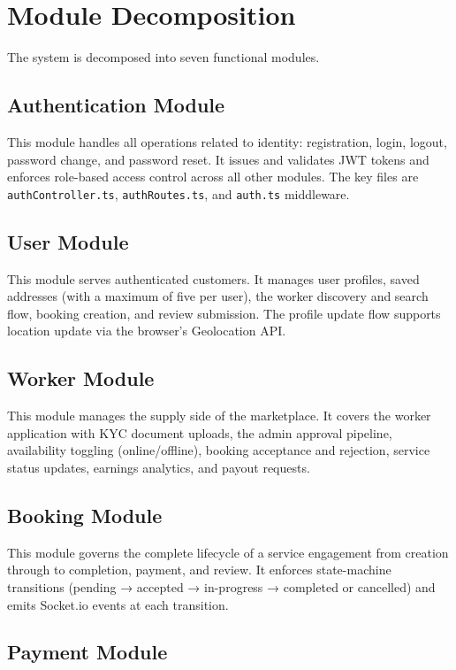 \documentclass[12pt,a4paper]{report}
\begin{document}
\section{Module Decomposition}

The system is decomposed into seven functional modules.

\subsection{Authentication Module}

This module handles all operations related to identity: registration, login, logout, password change, and password reset. It issues and validates JWT tokens and enforces role-based access control across all other modules. The key files are \texttt{authController.ts}, \texttt{authRoutes.ts}, and \texttt{auth.ts} middleware.

\subsection{User Module}

This module serves authenticated customers. It manages user profiles, saved addresses (with a maximum of five per user), the worker discovery and search flow, booking creation, and review submission. The profile update flow supports location update via the browser's Geolocation API.

\subsection{Worker Module}

This module manages the supply side of the marketplace. It covers the worker application with KYC document uploads, the admin approval pipeline, availability toggling (online/offline), booking acceptance and rejection, service status updates, earnings analytics, and payout requests.

\subsection{Booking Module}

This module governs the complete lifecycle of a service engagement from creation through to completion, payment, and review. It enforces state-machine transitions (pending → accepted → in-progress → completed or cancelled) and emits Socket.io events at each transition.

\subsection{Payment Module}
\end{document}
